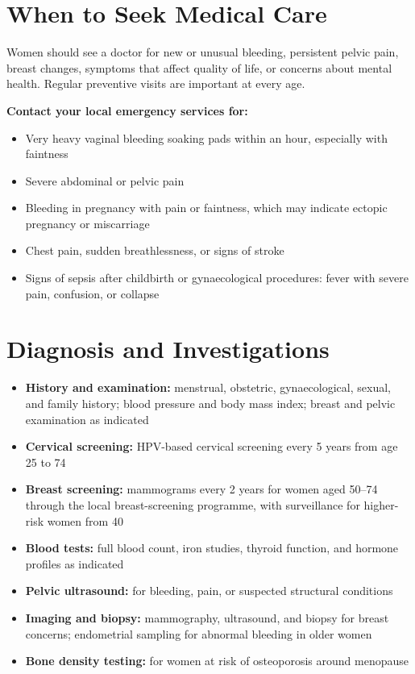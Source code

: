 \section*{When to Seek Medical Care}
Women should see a doctor for new or unusual bleeding, persistent pelvic pain, breast changes, symptoms that affect quality of life, or concerns about mental health. Regular preventive visits are important at every age.

\textbf{Contact your local emergency services for:}
\begin{itemize}
    \item Very heavy vaginal bleeding soaking pads within an hour, especially with faintness
    \item Severe abdominal or pelvic pain
    \item Bleeding in pregnancy with pain or faintness, which may indicate ectopic pregnancy or miscarriage
    \item Chest pain, sudden breathlessness, or signs of stroke
    \item Signs of sepsis after childbirth or gynaecological procedures: fever with severe pain, confusion, or collapse
\end{itemize}

\section*{Diagnosis and Investigations}
\begin{itemize}
    \item \textbf{History and examination:} menstrual, obstetric, gynaecological, sexual, and family history; blood pressure and body mass index; breast and pelvic examination as indicated
    \item \textbf{Cervical screening:} HPV-based cervical screening every 5 years from age 25 to 74
    \item \textbf{Breast screening:} mammograms every 2 years for women aged 50--74 through the local breast-screening programme, with surveillance for higher-risk women from 40
    \item \textbf{Blood tests:} full blood count, iron studies, thyroid function, and hormone profiles as indicated
    \item \textbf{Pelvic ultrasound:} for bleeding, pain, or suspected structural conditions
    \item \textbf{Imaging and biopsy:} mammography, ultrasound, and biopsy for breast concerns; endometrial sampling for abnormal bleeding in older women
    \item \textbf{Bone density testing:} for women at risk of osteoporosis around menopause
\end{itemize}

